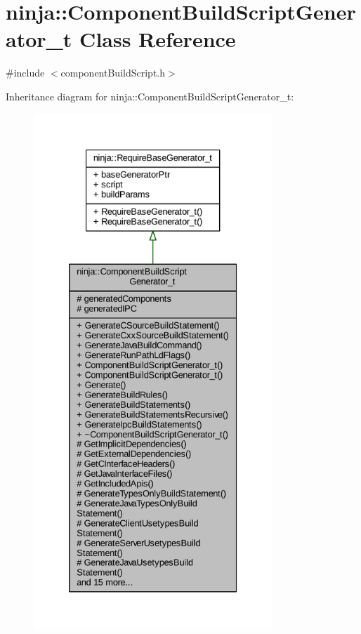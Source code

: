 \hypertarget{classninja_1_1_component_build_script_generator__t}{}\section{ninja\+:\+:Component\+Build\+Script\+Generator\+\_\+t Class Reference}
\label{classninja_1_1_component_build_script_generator__t}


{\ttfamily \#include $<$component\+Build\+Script.\+h$>$}



Inheritance diagram for ninja\+:\+:Component\+Build\+Script\+Generator\+\_\+t\+:
\nopagebreak
\begin{figure}[H]
\begin{center}
\leavevmode
\includegraphics[height=550pt]{classninja_1_1_component_build_script_generator__t__inherit__graph}
\end{center}
\end{figure}


